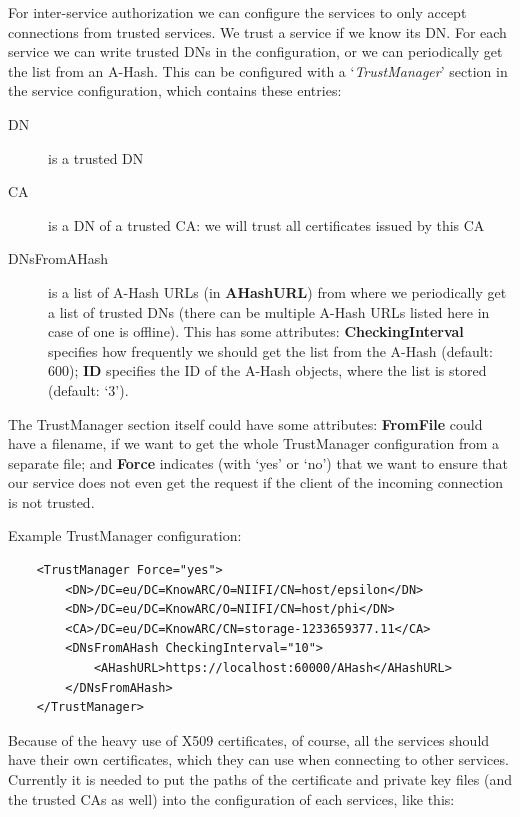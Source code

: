 \documentclass{book}
\begin{document}
For inter-service authorization we can configure the services to only accept connections from trusted services. We trust a service if we know its DN. For each service we can write trusted DNs in the configuration, or we can periodically get the list from an A-Hash. This can be configured with a `\emph{TrustManager}' section in the service configuration, which contains these entries:

\begin{description}
    \item[DN] is a trusted DN
    \item[CA] is a DN of a trusted CA: we will trust all certificates issued by this CA
    \item[DNsFromAHash] is a list of A-Hash URLs (in \textbf{AHashURL}) from where we periodically get a list of trusted DNs (there can be multiple A-Hash URLs listed here in case of one is offline). This has some attributes: \textbf{CheckingInterval} specifies how frequently we should get the list from the A-Hash (default: 600); \textbf{ID} specifies the ID of the A-Hash objects, where the list is stored (default: `3').
\end{description}

The TrustManager section itself could have some attributes: \textbf{FromFile} could have a filename, if we want to get the whole TrustManager configuration from a separate file; and \textbf{Force} indicates (with `yes' or `no') that we want to ensure that our service does not even get the request if the client of the incoming connection is not trusted. 

Example TrustManager configuration:

\begin{verbatim}
    <TrustManager Force="yes">
        <DN>/DC=eu/DC=KnowARC/O=NIIFI/CN=host/epsilon</DN>
        <DN>/DC=eu/DC=KnowARC/O=NIIFI/CN=host/phi</DN>
        <CA>/DC=eu/DC=KnowARC/CN=storage-1233659377.11</CA>
        <DNsFromAHash CheckingInterval="10">
            <AHashURL>https://localhost:60000/AHash</AHashURL>
        </DNsFromAHash>
    </TrustManager>
\end{verbatim}

Because of the heavy use of X509 certificates, of course, all the services should have their own certificates, which they can use when connecting to other services. Currently it is needed to put the paths of the certificate and private key files (and the trusted CAs as well) into the configuration of each services, like this:
\end{document}
